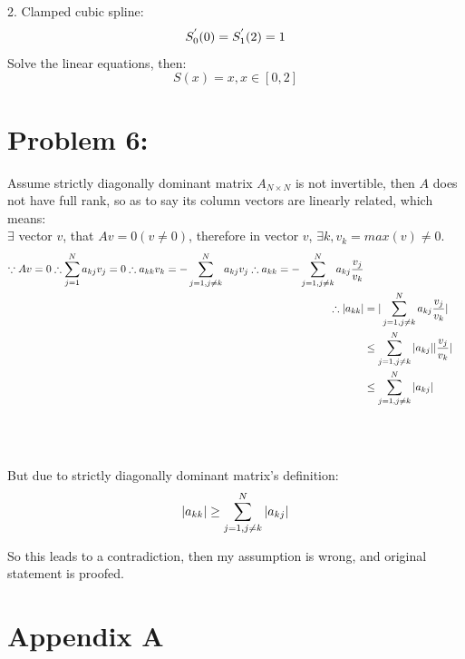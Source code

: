 \documentclass{article}
\begin{document}
2. Clamped cubic spline:
\begin{equation}
    S_0^{'}(0)=S_1^{'}(2)=1 \\
    \nonumber \\
\end{equation}
Solve the linear equations, then:
\begin{equation}
    S(x)=x, x \in [0,2] \nonumber
\end{equation}

\section{Problem 6:}
Assume strictly diagonally dominant matrix $A_{N \times N}$ is not invertible, then $A$ does not have full rank, so as to say its column vectors are linearly related, which means:\\
$\exists$ vector $v$, that $Av=0(v \neq 0)$, therefore in vector $v$, $\exists k, v_k=max(v) \neq 0$.
\begin{equation}
\begin{aligned}
    \because Av=0 
    \therefore \sum_{j=1}^N{a_{kj}v_j}=0 
    \therefore a_{kk}v_k=-\sum_{j=1, j \neq k}^N{a_{kj}{v_j}} 
    \therefore a_{kk}=-\sum_{j=1, j \neq k}^N{a_{kj}\frac{v_j}{v_k}} \\
    
    \centering 
    \therefore |a_{kk}| &=|\sum_{j=1, j \neq k}^N{a_{kj}\frac{v_j}{v_k}}| \\
    & \leq \sum_{j=1, j \neq k}^N{|a_{kj}| |\frac{v_j}{v_k}}| \\
    & \leq \sum_{j=1, j \neq k}^N{|a_{kj}|} \\
    \nonumber
\end{aligned}
\end{equation}
\\
\\
But due to strictly diagonally dominant matrix's definition: \\
\begin{equation}
    |a_{kk}| \geq \sum_{j=1, j \neq k}^N{|a_{kj}|} \nonumber \\
\end{equation}

So this leads to a contradiction, then my assumption is wrong, and original statement is proofed. 
\newpage
\appendix
\section{Appendix A}
\end{document}
